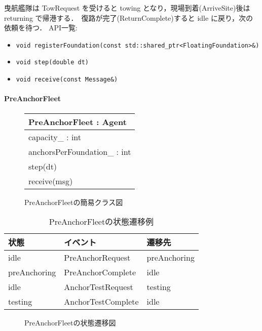 \documentclass[10pt,letterpaper]{jsarticle}
\begin{document}
曳航艦隊は TowRequest を受けると towing となり，現場到着(ArriveSite)後は returning で帰港する．\
復路が完了(ReturnComplete)すると idle に戻り，次の依頼を待つ．
API一覧:
\begin{itemize}
  \item \texttt{void registerFoundation(const std::shared\_ptr<FloatingFoundation>\&)}
  \item \texttt{void step(double dt)}
  \item \texttt{void receive(const Message\&)}
\end{itemize}

\paragraph{PreAnchorFleet}
\begin{figure}[htbp]
  \centering
  \begin{tabular}{|l|}
    \hline
    \textbf{PreAnchorFleet} : Agent \\
    \hline
    capacity\_ : int \\
    anchorsPerFoundation\_ : int \\
    \hline
    step(dt) \\
    receive(msg) \\
    \hline
  \end{tabular}
  \caption{PreAnchorFleetの簡易クラス図}
\end{figure}
\begin{table}[htbp]
  \centering
  \begin{tabular}{lll}
    \toprule
    状態 & イベント & 遷移先 \\
    \midrule
    idle & PreAnchorRequest & preAnchoring \\
    preAnchoring & PreAnchorComplete & idle \\
    idle & AnchorTestRequest & testing \\
    testing & AnchorTestComplete & idle \\
    \bottomrule
  \end{tabular}
  \caption{PreAnchorFleetの状態遷移例}
\end{table}
\begin{figure}[htbp]
  \centering
  \caption{PreAnchorFleetの状態遷移図}
\end{figure}
\end{document}
